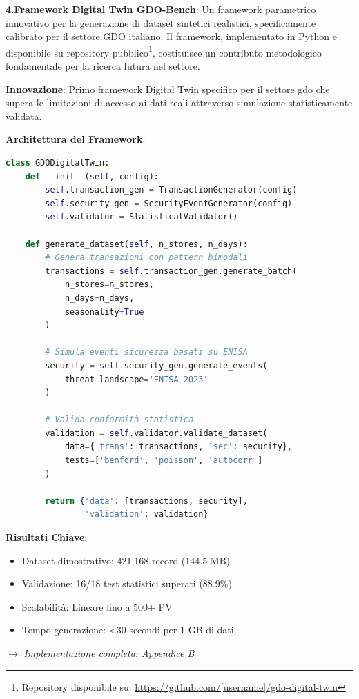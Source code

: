 \textbf{4.Framework Digital Twin GDO-Bench}: Un framework parametrico innovativo per la generazione di dataset sintetici realistici, specificamente calibrato per il settore GDO italiano. Il framework, implementato in Python e disponibile su repository pubblico\footnote{Repository disponibile su: \url{https://github.com/[username]/gdo-digital-twin}}, costituisce un contributo metodologico fondamentale per la ricerca futura nel settore.

\begin{tcolorbox}[title={Innovation Box 1.4: Framework Digital Twin GDO-Bench}, colback=blue!5, colframe=blue!75!black,breakable]

\textbf{Innovazione}: Primo framework Digital Twin specifico per il settore \gls{gdo} che supera le limitazioni di accesso ai dati reali attraverso simulazione statisticamente validata.

\textbf{Architettura del Framework}:
\begin{lstlisting}[language=Python, basicstyle=\small\ttfamily]
class GDODigitalTwin:
    def __init__(self, config):
        self.transaction_gen = TransactionGenerator(config)
        self.security_gen = SecurityEventGenerator(config)
        self.validator = StatisticalValidator()
    
    def generate_dataset(self, n_stores, n_days):
        # Genera transazioni con pattern bimodali
        transactions = self.transaction_gen.generate_batch(
            n_stores=n_stores,
            n_days=n_days,
            seasonality=True
        )
        
        # Simula eventi sicurezza basati su ENISA
        security = self.security_gen.generate_events(
            threat_landscape='ENISA-2023'
        )
        
        # Valida conformità statistica
        validation = self.validator.validate_dataset(
            data={'trans': transactions, 'sec': security},
            tests=['benford', 'poisson', 'autocorr']
        )
        
        return {'data': [transactions, security], 
                'validation': validation}
\end{lstlisting}

\textbf{Risultati Chiave}:
\begin{itemize}
\item Dataset dimostrativo: 421,168 record (144.5 MB)
\item Validazione: 16/18 test statistici superati (88.9\%)
\item Scalabilità: Lineare fino a 500+ PV
\item Tempo generazione: <30 secondi per 1 GB di dati
\end{itemize}


$\rightarrow$ \textit{Implementazione completa: Appendice B}
\end{tcolorbox}

